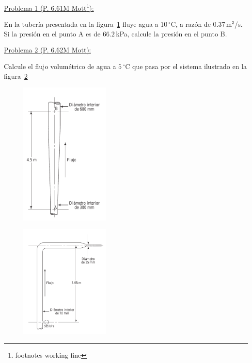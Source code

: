 \documentclass[11pt]{report}
\begin{document}

\vspace{1cm}


\vspace{1cm}

\underline {Problema 1 (P. 6.61M Mott\footnote{footnotes working fine}):}

\vspace{0.2cm}

En la tuber\'ia presentada en la figura~\ref{fig:fig1} fluye agua a $10$\,$^\circ$C, a raz\'on de $0.37$\,m$^3$/s. Si la presi\'on en el punto A es de $66.2$\,kPa, calcule la presi\'on en el punto B.

\vspace{0.2cm}

\underline {Problema 2 (P. 6.62M Mott):}

\vspace{0.2cm}

Calcule el flujo volum\'etrico de agua a $5$\,$^\circ$C que pasa por el sistema ilustrado en la figura~\ref{fig:fig2}


\begin{multicols}{2}
\begin{figure}[H]
\centering\includegraphics[width=0.4\textwidth]{p1.png}
\caption{\label{fig:fig1} }
\end{figure}
\columnbreak
\vspace*{\fill}
\begin{figure}[H]
\centering\includegraphics[width=0.4\textwidth]{p2.png}
\caption{\label{fig:fig2}}
\end{figure}
\end{multicols}
\end{document}
